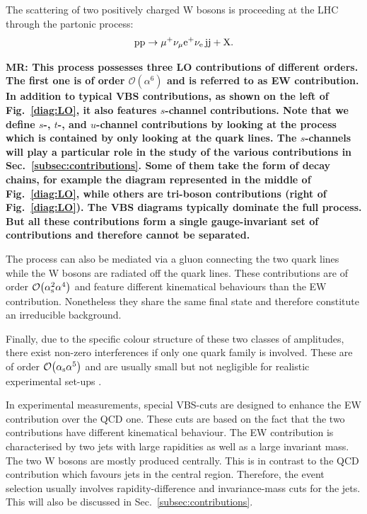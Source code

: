 The scattering of two positively charged W bosons is proceeding at the LHC through the partonic process:
%
\begin{equation}
\text{p}\text{p}\to\mu^+\nu_\mu{\rm e}^+\nu_{\rm e}\,\text{j}\text{j}+\mathrm{X}.
\end{equation}

{\bf MR: This process possesses three LO contributions of different orders.
The first one is of order $\mathcal{O}{\left(\alpha^{6}\right)}$ and is referred to as EW contribution.
In addition to typical VBS contributions, as shown on the left of Fig.~\ref{diag:LO}, it also features $s$-channel contributions.
Note that we define $s$-, $t$-, and $u$-channel contributions by looking at the process which is contained by only looking at the quark lines.
The $s$-channels will play a particular role in the study of the various contributions in Sec.~\ref{subsec:contributions}.
Some of them take the form of decay chains, for example the diagram represented in the middle of Fig.~\ref{diag:LO}, while others are tri-boson contributions (right of Fig.~\ref{diag:LO}).
The VBS diagrams typically dominate the full process.
But all these contributions form a single gauge-invariant set of contributions and therefore cannot be separated.}

The process can also be mediated via a gluon connecting the two quark lines while the W bosons are radiated off the quark lines.
These contributions are of order $\mathcal{O}{\left(\alpha_\text{s}^{2}\alpha^{4}\right)}$ and feature different kinematical behaviours than the EW contribution.
Nonetheless they share the same final state and therefore constitute an irreducible background.

Finally, due to the specific colour structure of these two classes of amplitudes, there exist non-zero interferences if only one quark family is involved.
These are of order $\mathcal{O}{\left(\alpha_{\rm s}\alpha^{5}\right)}$ and are usually small but not negligible for realistic experimental set-ups \cite{Biedermann:2017bss}.

In experimental measurements, special VBS-cuts are designed to enhance the EW contribution over the QCD one.
These cuts are based on the fact that the two contributions have different kinematical behaviour.
The EW contribution is characterised by two jets with large rapidities as well as a large invariant mass.
The two W bosons are mostly produced centrally.
This is in contrast to the QCD contribution which favours jets in the central region.
Therefore, the event selection usually involves rapidity-difference and invariance-mass cuts for the jets.
This will also be discussed in Sec.~\ref{subsec:contributions}.


